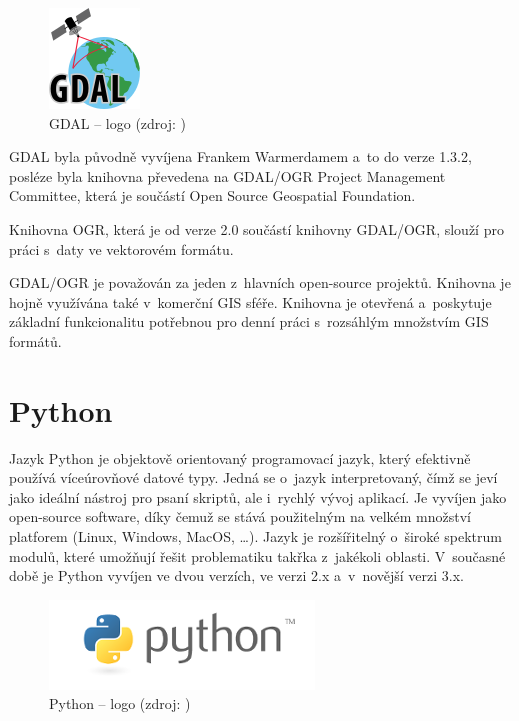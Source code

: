 \documentclass[a4paper,12pt,oneside]{book}
\begin{document}
\begin{figure}[h]
\centering
\includegraphics[scale=1]{images/gdal-logo.png}
\caption[GDAL -- logo]{GDAL -- logo (zdroj: \cite{gdal})}
\end{figure}

GDAL byla původně vyvíjena Frankem Warmerdamem a~to do verze 1.3.2, posléze byla knihovna převedena na GDAL/OGR Project Management Committee, která je součástí Open Source Geospatial Foundation.\cite{gdal_wiki}

Knihovna OGR, která je od verze 2.0 součástí knihovny GDAL/OGR, slouží pro práci s~daty ve vektorovém formátu.\cite{gdal}

GDAL/OGR je považován za jeden z~hlavních open-source projektů. Knihovna je hojně využívána také v~komerční GIS sféře. Knihovna je otevřená a~poskytuje základní funkcionalitu potřebnou pro denní práci s~rozsáhlým množstvím GIS formátů.\cite{gdal_wiki}


\section{Python}

Jazyk Python je objektově orientovaný programovací jazyk, který efektivně používá víceúrovňové datové typy. Jedná se o~jazyk interpretovaný, čímž se jeví jako ideální nástroj pro psaní skriptů, ale i~rychlý vývoj aplikací. Je vyvíjen jako open-source software, díky čemuž se stává použitelným na velkém množství platforem (Linux, Windows, MacOS, \dots). Jazyk je rozšířitelný o~široké spektrum modulů, které umožňují řešit problematiku takřka z~jakékoli oblasti. V~současné době je Python vyvíjen ve dvou verzích, ve verzi 2.x a~v~novější verzi 3.x.
\cite{dive_into_python}
\cite{python_web}

\begin{figure}[htb]
\centering
\includegraphics[scale=1]{images/python-logo.png}
\caption[Python -- logo]{Python -- logo (zdroj: \cite{python_web})}
\end{figure}
\end{document}
